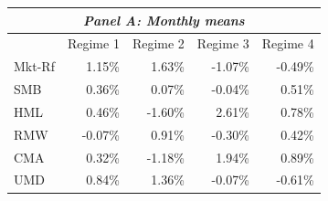 \begin{tabular*}{\textwidth}{l@{\extracolsep{\fill}}rrrr}
\toprule
\multicolumn{5}{c}{\textit{Panel A: Monthly means}} \\
\midrule
 & Regime 1 & Regime 2 & Regime 3 & Regime 4 \\
\midrule
Mkt-Rf & 1.15\% & 1.63\% & -1.07\% & -0.49\% \\
SMB & 0.36\% & 0.07\% & -0.04\% & 0.51\% \\
HML & 0.46\% & -1.60\% & 2.61\% & 0.78\% \\
RMW & -0.07\% & 0.91\% & -0.30\% & 0.42\% \\
CMA & 0.32\% & -1.18\% & 1.94\% & 0.89\% \\
UMD & 0.84\% & 1.36\% & -0.07\% & -0.61\% \\
\midrule[\heavyrulewidth]
\end{tabular*}
